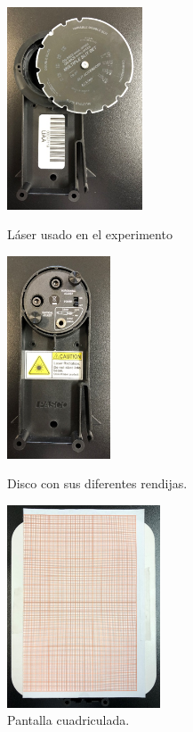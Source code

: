 \documentclass[12pt,a4paper]{article}
\begin{document}
\begin{figure}[hbtp!]
	\begin{minipage}{0.3 \linewidth}
		\centering
		\includegraphics[height = 6cm]{2_METODO/image_2}
		\caption{Láser usado en el experimento}
		\label{fig:laser}
	\end{minipage} \hspace{4mm}
	\begin{minipage}{0.3 \linewidth}
		\centering
		\includegraphics[height = 6cm]{2_METODO/image_3}
		\caption{Disco con sus diferentes rendijas.}
		\label{fig:disco}
	\end{minipage} \hspace{4mm}
	\begin{minipage}{0.3 \linewidth}
		\centering
		\includegraphics[height = 6cm]{2_METODO/image_4}
		\caption{Pantalla cuadriculada.}
		\label{fig:pantalla}
	\end{minipage}
\end{figure}
\end{document}
